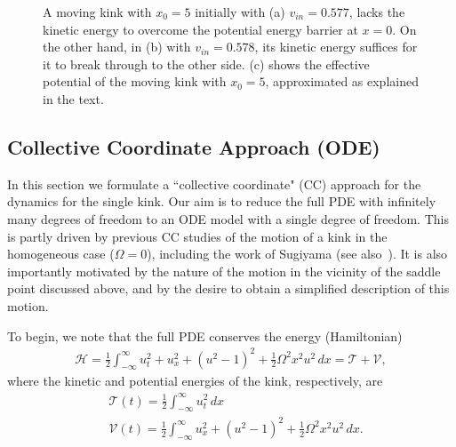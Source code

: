 \documentclass[vecphys]{svmult}		%
\begin{document}
\begin{figure}[tbp]
\begin{center}

  \end{center}
   \caption{ A moving kink with $x_0=5$ initially with (a) $v_{in}=0.577$, lacks the kinetic energy to overcome the potential energy
    barrier at $x=0$. On the other hand, in (b) with
    $v_{in}=0.578$, its kinetic energy suffices for
    it to break through to the other side. {(c) shows the effective potential of the moving kink with $x_0=5$, approximated as explained in the text. } }
    \label{nonzerovelocity}
\end{figure}



\subsection{Collective Coordinate Approach (ODE)}



In this section we formulate a ``collective coordinate" (CC) approach for the
dynamics for the single kink. Our aim is to reduce the full PDE with
infinitely many degrees of freedom to 
an ODE
model with a single degree of freedom. This is partly driven by
previous CC studies of the motion of a kink
in the homogeneous case ($\Omega = 0$), 
{including the work of Sugiyama \cite{sugiyama}
(see also~\cite{anninos})}. It is also importantly motivated
by the
nature of the motion in the vicinity of the
saddle point discussed above, and by the desire to obtain a simplified description
of this motion.

To begin, we note that the full PDE conserves the energy (Hamiltonian)
\begin{align}
\mathcal H = \frac{1}{2}\int_{-\infty}^\infty u_t^2 + u_x^2 + (u^2-1)^2 + \frac{1}{2}\Omega^2 x^2u^2 \, dx = \mathcal T + \mathcal V,
\label{eq:H_par}
\end{align}
where the kinetic and potential energies of the kink, respectively, are
\begin{align*}
&\mathcal{T}(t) = \frac{1}{2} \int_{-\infty}^\infty u_t^2 \, dx 
\\
&\mathcal{V}(t) = \frac{1}{2} \int_{-\infty}^\infty u_x^2 + (u^2-1)^2 + \frac{1}{2}\Omega^2 x^2u^2 \, dx. 
\end{align*}
 
\end{document}

